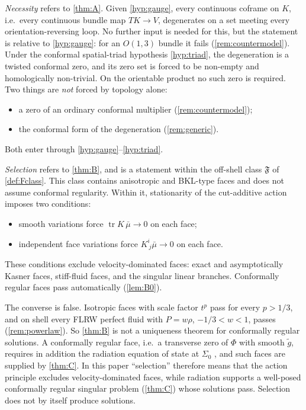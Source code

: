 \documentclass[11pt]{article}
\theoremstyle{canonmath}
\theoremstyle{canonpostulate}
\theoremstyle{canonproposition}
\theoremstyle{canonmath}
\theoremstyle{canonproposition}
\providecommand{\Vb}{\mathcal{V}}
\providecommand{\Fcl}{\mathfrak{F}}
\providecommand{\Klein}{\mathcal{K}}
\def\mathrm#1{#1}%
\def\mathcal#1{#1}%
\begin{document}
\emph{Necessity} refers to \cref{thm:A}. Given \ref{hyp:gauge}, every continuous coframe on $\Klein$, i.e.\ every continuous bundle map $T\Klein\to\Vb$, degenerates on a set meeting every orientation-reversing loop. No further input is needed for this, but the statement is relative to \ref{hyp:gauge}: for an $\mathrm{O}(1,3)$ bundle it fails (\cref{rem:countermodel}). Under the conformal spatial-triad hypothesis \ref{hyp:triad}, the degeneration is a twisted conformal zero, and its zero set is forced to be non-empty and homologically non-trivial. On the orientable product no such zero is required. Two things are \emph{not} forced by topology alone:
\begin{itemize}
\item a zero of an ordinary conformal multiplier (\cref{rem:countermodel});
\item the conformal form of the degeneration (\cref{rem:generic}).
\end{itemize}
Both enter through \ref{hyp:gauge}--\ref{hyp:triad}.

\emph{Selection} refers to \cref{thm:B}, and is a statement within the off-shell class $\Fcl$ of \cref{def:Fclass}. This class contains anisotropic and BKL-type faces and does not assume conformal regularity. Within it, stationarity of the cut-additive action imposes two conditions:
\begin{itemize}
\item smooth variations force $\operatorname{tr}K\,\bar\mu\to0$ on each face;
\item independent face variations force $K^i_{\ j}\bar\mu\to0$ on each face.
\end{itemize}
These conditions exclude velocity-dominated faces: exact and asymptotically Kasner faces, stiff-fluid faces, and the singular linear branches. Conformally regular faces pass automatically (\cref{lem:B0}).

The converse is false. Isotropic faces with scale factor $t^p$ pass for every $p>1/3$, and on shell every FLRW perfect fluid with $P = w\rho$, $-1/3<w<1$, passes (\cref{rem:powerlaw}). So \cref{thm:B} is not a uniqueness theorem for conformally regular solutions. A conformally regular face, i.e.\ a transverse zero of $\Phi$ with smooth $\tilde g$, requires in addition the radiation equation of state at $\Sigma_0$ \cite{Newman1993a,AnguigeTod1999a}, and such faces are supplied by \cref{thm:C}. In this paper ``selection'' therefore means that the action principle excludes velocity-dominated faces, while radiation supports a well-posed conformally regular singular problem (\cref{thm:C}) whose solutions pass. Selection does not by itself produce solutions.
\end{document}
